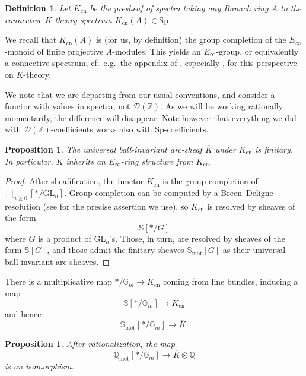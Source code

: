 \documentclass[11pt]{amsart}
\numberwithin{equation}{section}
\numberwithin{theorem}{section}
\newtheorem{proposition}[theorem]{Proposition}
\newtheorem{definition}[theorem]{Definition}
\theoremstyle{definition}
\begin{document}
\begin{definition} Let $K_{\mathrm{cn}}$ be the presheaf of spectra taking any Banach ring $A$ to the connective $K$-theory spectrum $K_{\mathrm{cn}}(A)\in \mathrm{Sp}$.
\end{definition}

We recall that $K_{\mathrm{cn}}(A)$ is (for us, by definition) the group completion of the $E_\infty$-monoid of finite projective $A$-modules. This yields an $E_\infty$-group, or equivalently a connective spectrum, cf.~e.g.~the appendix of \cite{BhattScholzeWitt}, especially \cite[Definition 12.13]{BhattScholzeWitt}, for this perspective on $K$-theory.

We note that we are departing from our usual conventions, and consider a functor with values in spectra, not $\mathcal D(\mathbb Z)$. As we will be working rationally momentarily, the difference will disappear. Note however that everything we did with $\mathcal D(\mathbb Z)$-coefficients works also with $\mathrm{Sp}$-coefficients.

\begin{proposition} The universal ball-invariant arc-sheaf $\overline{K}$ under $K_{\mathrm{cn}}$ is finitary. In particular, $\overline{K}$ inherits an $E_\infty$-ring structure from $K_{\mathrm{cn}}$.
\end{proposition}

\begin{proof} After sheafification, the functor $K_{\mathrm{cn}}$ is the group completion of $\bigsqcup_{n\geq 0} [\ast/\mathrm{GL}_n]$. Group completion can be computed by a Breen--Deligne resolution (see \cite[Theorem 4.4]{AokiSemitopological} for the precise assertion we use), so $K_{\mathrm{cn}}$ is resolved by sheaves of the form
\[
\mathbb S[\ast/G]
\]
where $G$ is a product of $\mathrm{GL}_n$'s. Those, in turn, are resolved by sheaves of the form $\mathbb S[G]$, and those admit the finitary sheaves $\mathbb S_{\mathrm{mot}}[G]$ as their universal ball-invariant arc-sheaves.
\end{proof}

There is a multiplicative map $\ast/\mathbb G_m\to K_{\mathrm{cn}}$ coming from line bundles, inducing a map
\[
\mathbb S[\ast/\mathbb G_m]\to K_{\mathrm{cn}}
\]
and hence
\[
\mathbb S_{\mathrm{mot}}[\ast/\mathbb G_m]\to \overline{K}.
\]

\begin{proposition} After rationalization, the map
\[
\mathbb Q_{\mathrm{mot}}[\ast/\mathbb G_m]\to \overline{K}\otimes \mathbb Q
\]
is an isomorphism.
\end{proposition}
\end{document}
